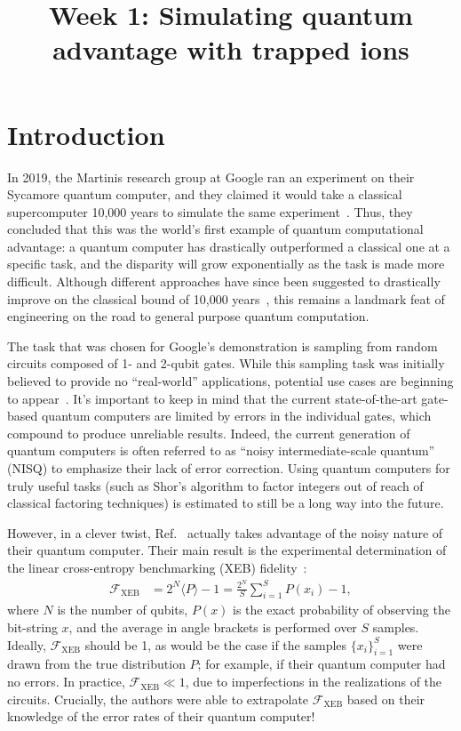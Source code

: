 \documentclass[12pt]{article}
\title{Week 1: Simulating quantum advantage with trapped ions}
\author{}
\date{}
\begin{document}
\maketitle

\thispagestyle{empty}


\section*{Introduction}

In 2019, the Martinis research group at Google ran an experiment on their Sycamore quantum computer, and they claimed it would take a classical supercomputer 10,000 years to simulate the same experiment~\cite{arute2019quantum}.
Thus, they concluded that this was the world's first example of quantum computational advantage: a quantum computer has drastically outperformed a classical one at a specific task, and the disparity will grow exponentially as the task is made more difficult.
Although different approaches have since been suggested to drastically improve on the classical bound of 10,000 years~\cite{pednault2019leveraging,pan2021simulating}, this remains a landmark feat of engineering on the road to general purpose quantum computation.

The task that was chosen for Google's demonstration is sampling from random circuits composed of 1- and 2-qubit gates.
While this sampling task was initially believed to provide no ``real-world'' applications, potential use cases are beginning to appear~\cite{aaronson2018certified}.
It's important to keep in mind that the current state-of-the-art gate-based quantum computers are limited by errors in the individual gates, which compound to produce unreliable results.
Indeed, the current generation of quantum computers is often referred to as ``noisy intermediate-scale quantum'' (NISQ) to emphasize their lack of error correction.
Using quantum computers for truly useful tasks (such as Shor's algorithm to factor integers out of reach of classical factoring techniques) is estimated to still be a long way into the future.

However, in a clever twist, Ref.~ actually takes advantage of the noisy nature of their quantum computer.
Their main result is the experimental determination of the linear cross-entropy benchmarking (XEB) fidelity~\cite{neill2018blueprint,boixo2018characterizing}:
\begin{align}
	\mathcal{F}_\mathrm{XEB}
	&= 2^N \langle P \rangle - 1
	= \frac{2^N}{S} \sum_{i=1}^S P(x_i) - 1,
\end{align}
where $N$ is the number of qubits, $P(x)$ is the exact probability of observing the bit-string $x$, and the average in angle brackets is performed over $S$ samples.
Ideally, $\mathcal{F}_\mathrm{XEB}$ should be 1, as would be the case if the samples $\{ x_i \}_{i=1}^S$ were drawn from the true distribution $P$; for example, if their quantum computer had no errors.
In practice, $\mathcal{F}_\mathrm{XEB} \ll 1$, due to imperfections in the realizations of the circuits.
Crucially, the authors were able to extrapolate $\mathcal{F}_\mathrm{XEB}$ based on their knowledge of the error rates of their quantum computer!
\end{document}
